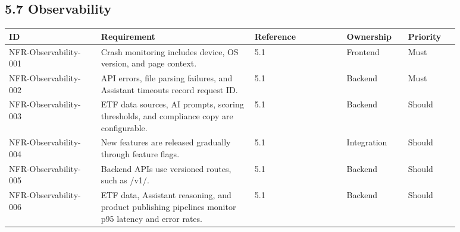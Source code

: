 \subsection{5.7 Observability}

\begingroup
\small
\begin{longtable}{L{0.18\linewidth}L{0.30\linewidth}L{0.18\linewidth}L{0.12\linewidth}L{0.10\linewidth}}
\toprule
\textbf{ID} & \textbf{Requirement} & \textbf{Reference} & \textbf{Ownership} & \textbf{Priority} \\
\midrule
NFR-Observability-001 & Crash monitoring includes device, OS version, and page context. & 5.1 & Frontend & Must \\
NFR-Observability-002 & API errors, file parsing failures, and Assistant timeouts record request ID. & 5.1 & Backend & Must \\
NFR-Observability-003 & ETF data sources, AI prompts, scoring thresholds, and compliance copy are configurable. & 5.1 & Backend & Should \\
NFR-Observability-004 & New features are released gradually through feature flags. & 5.1 & Integration & Should \\
NFR-Observability-005 & Backend APIs use versioned routes, such as /v1/. & 5.1 & Backend & Should \\
NFR-Observability-006 & ETF data, Assistant reasoning, and product publishing pipelines monitor p95 latency and error rates. & 5.1 & Backend & Should \\
\bottomrule
\end{longtable}
\endgroup
